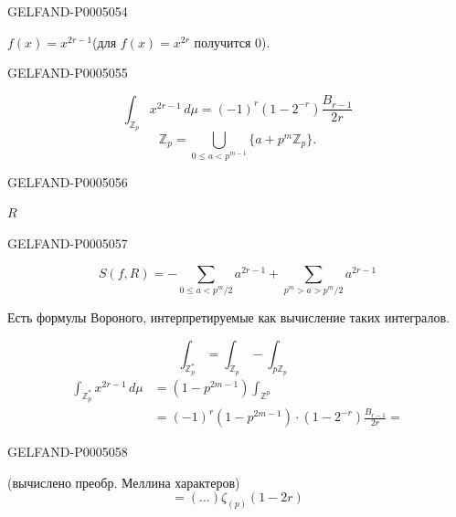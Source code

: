 \begin{GelfandAdjacentEvidence}{GELFAND-P000505}{4}


$f(x)=x^{2r-1}$\qquad (для $f(x)=x^{2r}$ получится 0).
\end{GelfandAdjacentEvidence}
\begin{GelfandAdjacentEvidence}{GELFAND-P000505}{5}


\[
\int_{\mathbb Z_p}x^{2r-1}\,d\mu=(-1)^r(1-2^{-r})\frac{B_{r-1}}{2r}
\]
\[
\mathbb Z_p=\bigcup_{0\le a<p^{m-1}}\{a+p^m\mathbb Z_p\}.
\]
\end{GelfandAdjacentEvidence}
\begin{GelfandAdjacentEvidence}{GELFAND-P000505}{6}


$R$
\end{GelfandAdjacentEvidence}
\begin{GelfandAdjacentEvidence}{GELFAND-P000505}{7}

\[
S(f,R)=-\sum_{0\le a<p^m/2}a^{2r-1}
+\sum_{p^m>a>p^m/2}a^{2r-1}
\]

Есть формулы Вороного, интерпретируемые как вычисление таких интегралов.

\[
\int_{\mathbb Z_p^*}=\int_{\mathbb Z_p}-\int_{p\mathbb Z_p}
\]
\[
\begin{aligned}
\int_{\mathbb Z_p^*}x^{2r-1}\,d\mu
&=(1-p^{2m-1})\int_{\mathbb Z^p}\\
&=(-1)^r(1-p^{2m-1})\cdot(1-2^{-r})\frac{B_{r-1}}{2r}=
\end{aligned}
\]
\end{GelfandAdjacentEvidence}
\begin{GelfandAdjacentEvidence}{GELFAND-P000505}{8}

\end{GelfandAdjacentEvidence}


(вычислено преобр. Меллина характеров)
\[
=(\ldots)\zeta_{(p)}(1-2r)
\]


